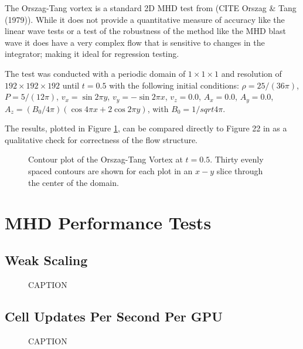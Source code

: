 The Orszag-Tang vortex is a standard 2D MHD test from (CITE Orszag \& Tang (1979)). While it does not provide a quantitative measure of accuracy like the linear wave tests or a test of the robustness of the method like the MHD blast wave it does have a very complex flow that is sensitive to changes in the integrator; making it ideal for regression testing.

The test was conducted with a periodic domain of $1\times1\times1$ and resolution of $192\times192\times192$ until $t = 0.5$ with the following initial conditions: 
$\rho = 25 / \left( 36 \pi \right)$,
$P    =  5 / \left( 12 \pi \right)$,
$v_x  = \sin 2\pi y$,
$v_y  = -\sin 2\pi x$,
$v_z  = 0.0$,
$A_x  = 0.0$,
$A_y  = 0.0$,
$A_z  = \left( B_0/4\pi \right) \left( \cos{4\pi x} + 2 \cos{2\pi y} \right)$, with $B_0 = 1/sqrt{4\pi}$.

The results, plotted in Figure \ref{fig:otv}, can be compared directly to Figure 22 in \cite{stone_athena_2008} as a qualitative check for correctness of the flow structure.

\begin{figure}[ht!]
    \caption{Contour plot of the Orszag-Tang Vortex at $t=0.5$. Thirty evenly spaced contours are shown for each plot in an $x-y$ slice through the center of the domain.  }
    \label{fig:otv}
\end{figure}

\section{MHD Performance Tests}
\label{sec:mhd-perf-tests}


\subsection{Weak Scaling}

\begin{figure}[ht!]
    \caption{CAPTION  }
    \label{fig:scaling-ms-per-gpu}
\end{figure}


\subsection{Cell Updates Per Second Per GPU}

\begin{figure}[ht!]
    \caption{CAPTION  }
    \label{fig:scaling-cells-per-second}
\end{figure}

